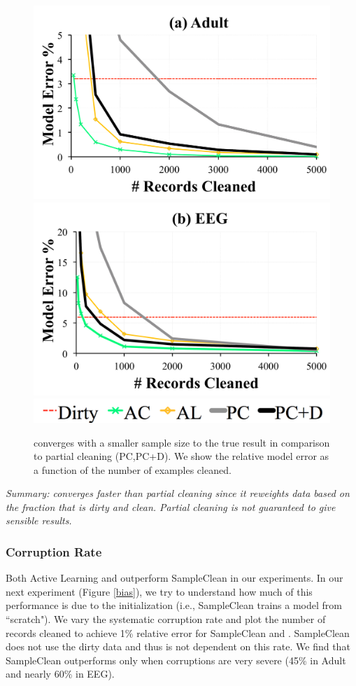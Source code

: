 \begin{figure}[ht!]
\centering
 \includegraphics[width=0.49\columnwidth]{exp/exp14a.pdf}
    \includegraphics[width=0.49\columnwidth]{exp/exp14b.pdf}
    \includegraphics[width=0.49\columnwidth]{exp/legend-14.png}\vspace{-0.5em}
 \caption{\sys converges with a smaller sample size to the true result in comparison to partial cleaning (PC,PC+D). We show the relative model error as a function of the number of examples cleaned. \label{pc-perf}}
\end{figure}

\noindent \emph{Summary: \sys converges faster than partial cleaning since it reweights data based on the fraction that is dirty and clean. Partial cleaning is not guaranteed to give sensible results.}

\subsubsection{Corruption Rate}
Both Active Learning and \sys outperform SampleClean in our experiments.
In our next experiment (Figure \ref{bias}), we try to understand how much of this performance 
is due to the initialization (i.e., SampleClean trains a model from ``scratch").
We vary the systematic corruption rate and plot the number of records cleaned to achieve 1\% relative error for SampleClean and \sys.
SampleClean does not use the dirty data and thus is not dependent on this rate.
We find that SampleClean outperforms \sys only when corruptions are very severe (45\% in Adult and nearly 60\% in EEG). 

